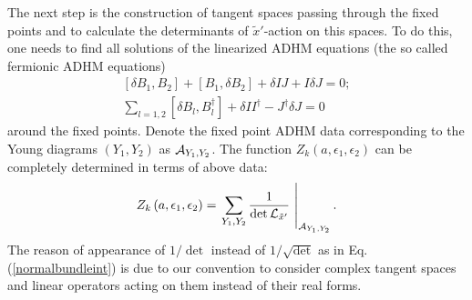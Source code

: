 \documentclass[a4paper,12pt]{article}
\begin{document}
The next step is the construction of tangent spaces passing
through the fixed points and to calculate the determinants of
${\tilde x}'$-action on this spaces. To do this, one needs to find
all solutions of the linearized ADHM equations (the so called
fermionic ADHM equations)
\begin{eqnarray}
\left[ \delta B_1, B_2\right]+\left[B_1, \delta B_2\right]+\delta IJ+I\delta J=0; \nonumber \\
\sum_{l=1,2} \left[ \delta B_l, B_l^{\dagger}\right]+\delta II^{\dagger}-J^{\dagger}\delta J=0
\label{fermionicADHM}
\end{eqnarray}
around the fixed points. Denote the fixed point ADHM data corresponding to the Young diagrams $(Y_1, Y_2)$ as
${\cal A}_{Y_1,Y_2}$. The function $Z_k \left( a, \epsilon_1, \epsilon_2 \right)$ can be completely determined
in terms of above data:
\begin{eqnarray}
Z_k \left(a, \epsilon_1, \epsilon_2 \right)= \left. \sum_{Y_1,
Y_2} \frac{1}{\det {\cal L}_{{\tilde x}'}} \, \, \right|_{{\cal
A}_{Y_1,Y_2}}. \label{localization}
\end{eqnarray}
The reason of appearance of $1/\det $ instead of $1/\sqrt{\det}$
as in Eq. (\ref{normalbundleint}) is due to our convention to
consider complex tangent spaces and linear operators acting  on
them instead of their real forms.
\end{document}
